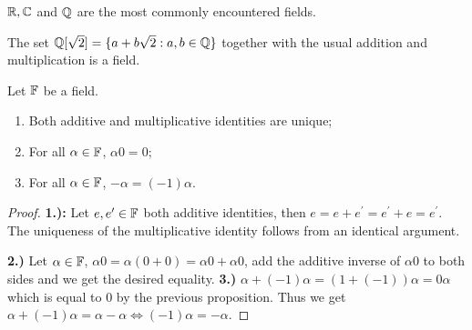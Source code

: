 \begin{example}
	$\mathbb{R}, \mathbb{C}$ and $\mathbb{Q}$ are the most commonly encountered fields.
\end{example}

\begin{example}
	The set $ \mathbb{Q}[\sqrt 2] = \{a + b \sqrt 2 : a, b \in \mathbb{Q} \}$ together with the usual addition and multiplication is a field.
\end{example}

\begin{proposition}
	Let $\mathbb{F}$ be a field.
\begin{enumerate}
	\item Both additive and multiplicative identities are unique; 
	\item For all $\alpha \in \mathbb{F}$, $\alpha 0 = 0$;
	\item For all $\alpha \in \mathbb{F}$, $- \alpha = (-1) \alpha$.
\end{enumerate}
\end{proposition}
\begin{proof}
	\textbf{1.):}
	Let $e, e^\prime \in \mathbb{F}$ both additive identities, then $e = e + e^\prime = e^\prime + e = e^\prime$. The uniqueness of the multiplicative identity follows from an identical argument.	
\par \textbf{2.)} 
Let $\alpha \in \mathbb{F}$, $\alpha 0 = \alpha (0 + 0) = \alpha 0 + \alpha 0$, add the additive inverse of $\alpha 0$ to both sides and we get the desired equality. \textbf{3.)}  $\alpha + (-1)\alpha = (1 + (-1))\alpha = 0\alpha$ which is equal to $0$ by the previous proposition. Thus we get $\alpha + (-1)\alpha = \alpha - \alpha \Leftrightarrow (-1) \alpha = - \alpha$. 
\end{proof}
